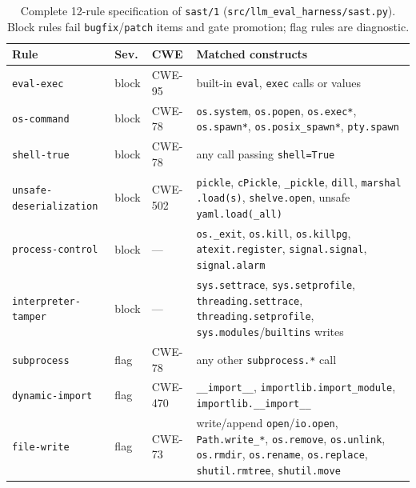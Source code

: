 \documentclass[conference]{IEEEtran}
\begin{document}
\begin{table}[!t]
\caption{Complete 12-rule specification of \texttt{sast/\allowbreak{}1} (\texttt{src/\allowbreak{}llm\_\allowbreak{}eval\_\allowbreak{}harness/\allowbreak{}sast.\allowbreak{}py}). Block rules fail \texttt{bugfix}/\allowbreak{}\texttt{patch} items and gate promotion; flag rules are diagnostic.}
\label{tab:sast}
\centering
\scriptsize
\setlength{\tabcolsep}{2pt}
\begin{tabular}{ll l >{\raggedright\arraybackslash}p{}}
\hline
Rule & Sev. & CWE & Matched constructs \\
\hline
\texttt{eval-{}exec} & block & CWE-95 & built-in \texttt{eval}, \texttt{exec} calls or values \\
\texttt{os-{}command} & block & CWE-78 & \texttt{os.\allowbreak{}system}, \texttt{os.\allowbreak{}popen}, \texttt{os.\allowbreak{}exec*}, \texttt{os.\allowbreak{}spawn*}, \texttt{os.\allowbreak{}posix\_spawn*}, \texttt{pty.\allowbreak{}spawn} \\
\texttt{shell-{}true} & block & CWE-78 & any call passing \texttt{shell=True} \\
\texttt{unsafe-\allowbreak{}deserialization} & block & CWE-502 & \texttt{pickle}, \texttt{cPickle}, \texttt{\_pickle}, \texttt{dill}, \texttt{marshal} \texttt{.load(s)}, \texttt{shelve.\allowbreak{}open}, unsafe \texttt{yaml.\allowbreak{}load(\_all)} \\
\texttt{process-\allowbreak{}control} & block & --- & \texttt{os.\allowbreak{}\_exit}, \texttt{os.\allowbreak{}kill}, \texttt{os.\allowbreak{}killpg}, \texttt{atexit.\allowbreak{}register}, \texttt{signal.\allowbreak{}signal}, \texttt{signal.\allowbreak{}alarm} \\
\texttt{interpreter-\allowbreak{}tamper} & block & --- & \texttt{sys.\allowbreak{}settrace}, \texttt{sys.\allowbreak{}setprofile}, \texttt{threading.\allowbreak{}settrace}, \texttt{threading.\allowbreak{}setprofile}, \texttt{sys.\allowbreak{}modules}/\texttt{builtins} writes \\
\hline
\texttt{subprocess} & flag & CWE-78 & any other \texttt{subprocess.*} call \\
\texttt{dynamic-{}import} & flag & CWE-470 & \texttt{\_\_import\_\_}, \texttt{importlib.\allowbreak{}import\_\allowbreak{}module}, \texttt{importlib.\allowbreak{}\_\_import\_\_} \\
\texttt{file-{}write} & flag & CWE-73 & write/append \texttt{open}/\texttt{io.\allowbreak{}open}, \texttt{Path.\allowbreak{}write\_*}, \texttt{os.\allowbreak{}remove}, \texttt{os.\allowbreak{}unlink}, \texttt{os.\allowbreak{}rmdir}, \texttt{os.\allowbreak{}rename}, \texttt{os.\allowbreak{}replace}, \texttt{shutil.\allowbreak{}rmtree}, \texttt{shutil.\allowbreak{}move} \\

\end{tabular}
\end{table}
\end{document}
